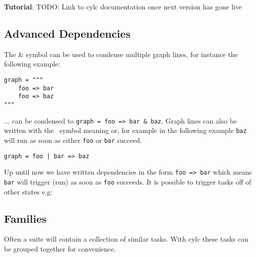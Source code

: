 \begin{shaded*}
\textbf{Tutorial}: TODO: Link to cylc documentation once next version has gone live
\end{shaded*}


\subsection{Advanced Dependencies}

The \& symbol can be used to condense multiple graph lines, for instance the
following example:

\begin{lstlisting}
graph = """
    foo => bar
    foo => baz
"""
\end{lstlisting}

... can be condensed to \lstinline{graph = foo => bar & baz}.
Graph lines can also be written with the \textbar \, symbol meaning or, for
example in the following example \lstinline{baz} will run as soon as either
\lstinline{foo} or \lstinline{bar} succeed.

\begin{lstlisting}
graph = foo | bar => baz
\end{lstlisting}

Up until now we have written dependencies in the form \lstinline{foo => bar}
which means \lstinline{bar} will trigger (run) as soon as \lstinline{foo}
succeeds. It is possible to trigger tasks off of other states e.g:



\subsection{Families}
\label{Families}

Often a suite will contain a collection of similar tasks. With cylc these
tasks can be grouped together for convenience.

